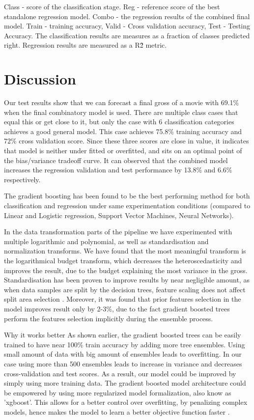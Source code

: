 Class - score of the classification stage. Reg - reference score of the best standalone regression model. Combo - the regression results of the combined final model. Train - training accuracy, Valid - Cross validation accuracy, Test - Testing Accuracy. The classification results are measures as a fraction of classes predicted right. Regression results are measured as a R\^2 metric. 


\section{Discussion}
Our test results show that we can forecast a final gross of a movie with 69.1\%  when the final combinatory model is used. There are multiple class cases that equal this or get close to it, but only the case with 6 classification categories achieves a good general model. This case achieves 75.8\% training accuracy and 72\% cross validation score. Since these three scores are close in value, it indicates that model is neither under fitted or overfitted, and sits on an optimal point of the bias/variance tradeoff curve. It can observed that the combined model increases the regression validation and test performance by 13.8\%  and 6.6\% respectively. 

The gradient boosting has been found to be the best performing method for both classification and regression under same experimentation conditions (compared to Linear and Logistic regression, Support Vector Machines, Neural Networks). 

In the data transformation parts of the pipeline we have experimented with multiple logarithmic and polynomial, as well as standardisation and  normalization transforms. We have found that the most meaningful transform  is the logarithmical budget transform, which decreases the heteroscedasticity and improves the result, due to the budget explaining the most variance in the gross. Standardisation has been proven to improve results by near negligible  amount, as when data samples are split by the decision trees, feature scaling does not affect split area selection \cite{chen2014introduction}. Moreover, it was found that prior features selection in the model improves result only by  2-3\%, due to the fact gradient boosted trees perform the features selection implicitly during the ensemble process. 

Why it works better
As shown earlier, the gradient boosted trees can be easily trained to have near 100\% train accuracy by adding more tree ensembles. Using small amount of data with big amount of ensembles leads to overfitting. In our case using more than 500 ensembles leads to increase in variance and decreases cross-validation and  test scores. As a result, our model could be improved by simply using more training data. The gradient boosted model architecture could be empowered by using more regularized model formalization, also know as 'xgboost'. This allows for a better control over overfitting, by penalizing complex models, hence makes the model to learn a better objective function faster \cite{chen2015}.  

